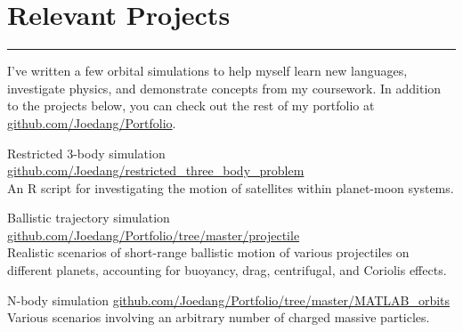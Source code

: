 \section{Relevant Projects}
\noindent\rule{\textwidth}{\hlinewidth}
I've written a few orbital simulations to help myself learn new languages, investigate physics, and demonstrate concepts from my coursework.
In addition to the projects below, you can check out the rest of my portfolio at \url{github.com/Joedang/Portfolio}.
	\begin{innerlist}
	\item Restricted 3-body simulation \hfill\url{github.com/Joedang/restricted\_three\_body\_problem}\\
	An R script for investigating the motion of satellites within planet-moon systems. 
	\item Ballistic trajectory simulation \hfill\url{github.com/Joedang/Portfolio/tree/master/projectile}\\
	Realistic scenarios of short-range ballistic motion of various projectiles on different planets, accounting for buoyancy, drag, centrifugal, and Coriolis effects.
	\item N-body simulation \hfill\url{github.com/Joedang/Portfolio/tree/master/MATLAB\_orbits}\\
	Various scenarios involving an arbitrary number of charged massive particles.
	\end{innerlist}
